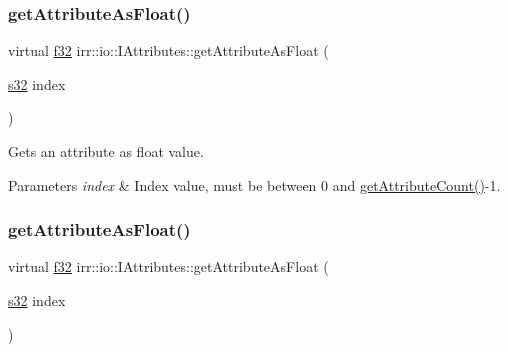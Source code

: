 \subsubsection{\texorpdfstring{get\+Attribute\+As\+Float()}{getAttributeAsFloat()}\hspace{0.1cm}{\footnotesize\ttfamily [3/4]}}
{\footnotesize\ttfamily virtual \hyperlink{namespaceirr_a0277be98d67dc26ff93b1a6a1d086b07}{f32} irr\+::io\+::\+I\+Attributes\+::get\+Attribute\+As\+Float (\begin{DoxyParamCaption}\item[{\hyperlink{namespaceirr_ac66849b7a6ed16e30ebede579f9b47c6}{s32}}]{index }\end{DoxyParamCaption})\hspace{0.3cm}{\ttfamily [pure virtual]}}



Gets an attribute as float value. 


\begin{DoxyParams}{Parameters}
{\em index} & Index value, must be between 0 and \hyperlink{classirr_1_1io_1_1IAttributes_a796bdd9440ee7ba0b6742a90a82870b6}{get\+Attribute\+Count()}-\/1. \\
\hline
\end{DoxyParams}
\mbox{\label{classirr_1_1io_1_1IAttributes_a9ef1a4d52b39daa2f0645df4eb8f40a9}} 
\subsubsection{\texorpdfstring{get\+Attribute\+As\+Float()}{getAttributeAsFloat()}\hspace{0.1cm}{\footnotesize\ttfamily [4/4]}}
{\footnotesize\ttfamily virtual \hyperlink{namespaceirr_a0277be98d67dc26ff93b1a6a1d086b07}{f32} irr\+::io\+::\+I\+Attributes\+::get\+Attribute\+As\+Float (\begin{DoxyParamCaption}\item[{\hyperlink{namespaceirr_ac66849b7a6ed16e30ebede579f9b47c6}{s32}}]{index }\end{DoxyParamCaption})\hspace{0.3cm}{\ttfamily [pure virtual]}}



